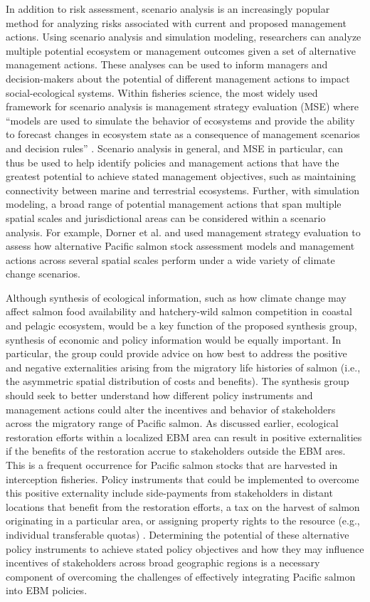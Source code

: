 In addition to risk assessment, scenario analysis is an increasingly
popular method for analyzing risks associated with current and proposed
management actions. Using scenario analysis and simulation modeling,
researchers can analyze multiple potential ecosystem or management
outcomes given a set of alternative management actions. These analyses
can be used to inform managers and decision-makers about the potential
of different management actions to impact social-ecological systems.
Within fisheries science, the most widely used framework for scenario
analysis is management strategy evaluation (MSE) where ``models are used
to simulate the behavior of ecosystems and provide the ability to
forecast changes in ecosystem state as a consequence of management
scenarios and decision rules'' \citep{Levin2009}. Scenario analysis in
general, and MSE in particular, can thus be used to help identify
policies and management actions that have the greatest potential to
achieve stated management objectives, such as maintaining connectivity
between marine and terrestrial ecosystems. Further, with simulation
modeling, a broad range of potential management actions that span
multiple spatial scales and jurisdictional areas can be considered
within a scenario analysis. For example, Dorner et al.
\citet{Dorner2009a} and \citet{Dorner2013} used management strategy
evaluation to assess how alternative Pacific salmon stock assessment
models and management actions across several spatial scales perform
under a wide variety of climate change scenarios.

Although synthesis of ecological information, such as how climate change
may affect salmon food availability and hatchery-wild salmon competition
in coastal and pelagic ecosystem, would be a key function of the
proposed synthesis group, synthesis of economic and policy information
would be equally important. In particular, the group could provide
advice on how best to address the positive and negative externalities
arising from the migratory life histories of salmon (i.e., the
asymmetric spatial distribution of costs and benefits). The synthesis
group should seek to better understand how different policy instruments
and management actions could alter the incentives and behavior of
stakeholders across the migratory range of Pacific salmon. As discussed
earlier, ecological restoration efforts within a localized EBM area can
result in positive externalities if the benefits of the restoration
accrue to stakeholders outside the EBM ares. This is a frequent
occurrence for Pacific salmon stocks that are harvested in interception
fisheries. Policy instruments that could be implemented to overcome this
positive externality include side-payments from stakeholders in distant
locations that benefit from the restoration efforts, a tax on the
harvest of salmon originating in a particular area, or assigning
property rights to the resource (e.g., individual transferable quotas)
\citep{Howlett2009a}. Determining the potential of these alternative
policy instruments to achieve stated policy objectives and how they may
influence incentives of stakeholders across broad geographic regions is
a necessary component of overcoming the challenges of effectively
integrating Pacific salmon into EBM policies.

